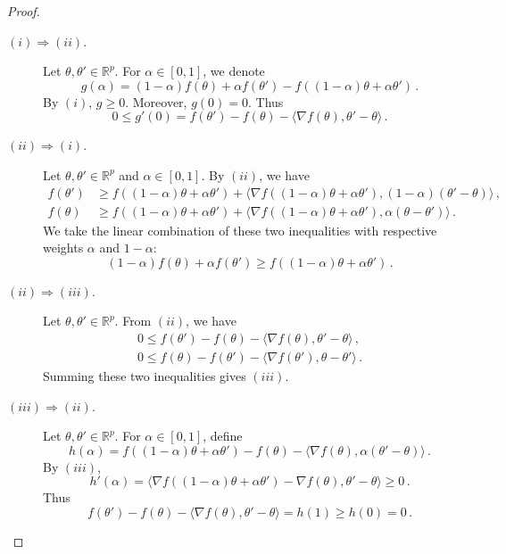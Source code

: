 \documentclass[11pt,reqno]{article}
\newcommand{\R}{\mathbb{R}}
\renewcommand{\leq}{\leqslant}
\renewcommand{\geq}{\geqslant}
\numberwithin{equation}{section}
\theoremstyle{plain}
\theoremstyle{definition}
\theoremstyle{remark}
\begin{document}
\begin{proof}
	\begin{description}
		\item[$(i) \Rightarrow (ii)$.] Let $\theta, \theta' \in \R^p$. For $\alpha \in [0,1]$, we denote 
		\begin{equation*}
			g(\alpha) = (1-\alpha) f(\theta) + \alpha f(\theta') - f((1-\alpha) \theta + \alpha \theta') \, .
		\end{equation*}
		By $(i)$, $g \geq 0$. Moreover, $g(0) = 0$. Thus 
		\begin{equation*}
			0 \leq g'(0) = f(\theta') - f(\theta) - \langle \nabla f(\theta) , \theta' - \theta \rangle \, .
		\end{equation*}
		\item[$(ii) \Rightarrow (i)$.] Let $\theta, \theta' \in \R^p$ and $\alpha \in [0,1]$. By $(ii)$, we have
		\begin{align*}
			f(\theta') &\geq f((1-\alpha) \theta + \alpha \theta') + \langle \nabla f((1-\alpha) \theta + \alpha \theta'), (1-\alpha)(\theta'-\theta) \rangle \, , \\
			f(\theta) &\geq f((1-\alpha) \theta + \alpha \theta') + \langle \nabla f((1-\alpha) \theta + \alpha \theta'), \alpha(\theta - \theta') \rangle \, .
		\end{align*}
		We take the linear combination of these two inequalities with respective weights $\alpha$ and $1-\alpha$:
		\begin{equation*}
			(1-\alpha) f(\theta) + \alpha f(\theta') \geq f((1-\alpha) \theta + \alpha \theta') \, .
		\end{equation*}
		\item[$(ii) \Rightarrow (iii)$.] Let $\theta, \theta' \in \R^p$. From $(ii)$, we have
		\begin{align*}
			0 \leq f(\theta') - f(\theta) - \langle \nabla f(\theta), \theta' - \theta \rangle \, , \\
			0 \leq f(\theta) - f(\theta') - \langle \nabla f(\theta'), \theta - \theta' \rangle \, .
		\end{align*}
		Summing these two inequalities gives $(iii)$.
		\item[$(iii) \Rightarrow (ii)$.] Let $\theta, \theta' \in \R^p$. For $\alpha \in [0,1]$, define 
		\begin{equation*}
			h(\alpha) = f((1-\alpha) \theta + \alpha \theta') - f(\theta) - \langle \nabla f(\theta), \alpha(\theta' - \theta) \rangle \, .
		\end{equation*}
		By $(iii)$, 
		\begin{equation*}
			h'(\alpha) = \langle \nabla f((1-\alpha) \theta + \alpha \theta') - \nabla f(\theta), \theta' - \theta \rangle \geq 0 \, .
		\end{equation*}
		Thus 
		\begin{equation*}
			f(\theta') - f(\theta) - \langle \nabla f(\theta), \theta' - \theta \rangle = h(1) \geq h(0) = 0 \, .
		\end{equation*}
	\end{description}
\end{proof}
\end{document}
